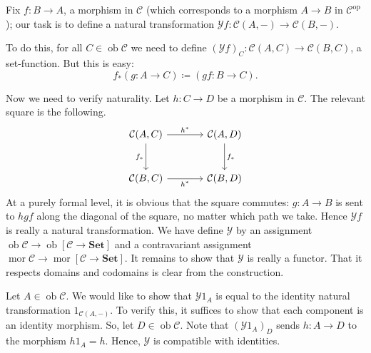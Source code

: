 \documentclass{report}
\newcommand{\mbold}[1]{\mathrm{\mathbf{#1}}}
\DeclareMathOperator{\ob}{ob}
\DeclareMathOperator{\mor}{mor}
\theoremstyle{definition}
\theoremstyle{plain}
\theoremstyle{definition}
\begin{document}
	 Fix $f\colon B \to A$, a morphism in $\mathcal{C}$ (which corresponds to a morphism $A\to B$ in $\mathcal{C}^{\text{op}}$); our task is to define a natural transformation $\mathscr{Y}f\colon \mathcal{C}(A,-)\to \mathcal{C}(B,-)$. 
	 
	 To do this, for all $C\in\ob \mathcal{C}$ we need to define $(\mathscr{Y}f)_C\colon \mathcal{C}(A,C)\to \mathcal{C}(B,C)$, a set-function. But this is easy: 
	 \[
	 	f_*(g\colon A \to C) \coloneqq (gf \colon B\to C).
	 \]
	 
	 Now we need to verify naturality. Let $h\colon C \to D$ be a morphism in $\mathcal{C}$. The relevant square is the following.
	 \[\begin{tikzcd}[row sep=large, column sep=large]
	 	{\mathcal{C}(A,C)} & {\mathcal{C}(A,D)} \\
	 	{\mathcal{C}(B,C)} & {\mathcal{C}(B,D)}
	 	\arrow["{h^*}"', from=2-1, to=2-2]
	 	\arrow["{h^*}", from=1-1, to=1-2]
	 	\arrow["{f_*}"', from=1-1, to=2-1]
	 	\arrow["{f_*}", from=1-2, to=2-2]
	 \end{tikzcd}\]
	At a purely formal level, it is obvious that the square commutes: $g\colon A \to B$ is sent to $hgf$ along the diagonal of the square, no matter which path we take. Hence $\mathscr{Y}f$ is really a natural transformation. We have define $\mathscr{Y}$ by an assignment $\ob\mathcal{C} \to \ob[\mathcal{C} \to \mbold{Set}]$ and a contravariant assignment $\mor\mathcal{C} \to \mor [\mathcal{C} \to \mbold{Set}]$. It remains to show that $\mathscr{Y}$ is really a functor. That it respects domains and codomains is clear from the construction.
	
	Let $A\in \ob \mathcal{C}$. We would like to show that $\mathscr{Y}1_A$ is equal to the identity natural transformation $1_{\mathcal{C}(A,-)}$. To verify this, it suffices to show that each component is an identity morphism. So, let $D\in\ob\mathcal{C}$. Note that $(\mathscr{Y}1_A)_D$ sends $h\colon A\to D$ to the morphism $h1_A = h$. Hence, $\mathscr{Y}$ is compatible with identities.
	
\end{document}
